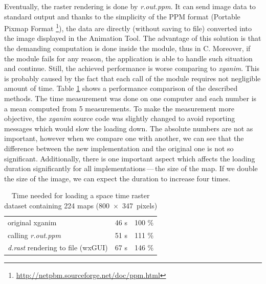 \documentclass[a4paper,12pt,oneside]{book}
\newcommand{\module}[1]{\textsl{#1}}
\newcommand{\at}{Animation Tool\xspace}
\newcommand{\dash}{\mbox{\,---\,}}
\begin{document}
Eventually, the raster rendering is done by \module{r.out.ppm}.
It can send image data to standard output and
thanks to the simplicity of the PPM format (Portable Pixmap Format%
\footnote{\url{http://netpbm.sourceforge.net/doc/ppm.html}}),
the data are directly (without saving to file) converted into the image displayed in the \at.
The advantage of this solution is that the demanding computation is done inside the module, thus in C.
Moreover, if the module fails for any reason, the application is able to handle such situation and continue.
Still, the achieved performance is worse comparing to \module{xganim}.
This is probably caused by the fact that each call of the module requires not negligible amount of time.
Table \ref{tab:comparisonTime} shows a performance comparison of the described methods.
The time measurement was done on one computer and each number is a mean computed from 5 measurements.
To make the measurement more objective, the \module{xganim} source code was slightly
changed to avoid reporting messages which would slow the loading down.
The absolute numbers are not as important, however when we compare one with another,
we can see that the difference between the new implementation and the original one is not so significant.
Additionally, there is one important aspect which affects the loading duration
significantly for all implementations\dash the size of the map.
If we double the size of the image, we can expect the duration to increase four times.

\begin{table}[h]
  \caption{Time needed for loading a space time raster dataset containing 224 maps (800~$\times$~347~pixels)}
  \label{tab:comparisonTime}
  \centering
    \begin{tabular}{lrr}
    \toprule
    original xganim & 46 s & 100 \%\\
    calling \module{r.out.ppm} & 51 s & 111 \%\\
    \module{d.rast} rendering to file (wxGUI) & 67 s & 146 \%\\
    \bottomrule

    \end{tabular}
\end{table}

\end{document}
